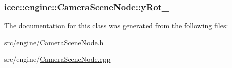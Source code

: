 \label{classicee_1_1engine_1_1CameraSceneNode_a88594483a4aa500a2ced3781a2179e78}
\hypertarget{classicee_1_1engine_1_1CameraSceneNode_a47c1195747ae82d087fb380fce092dbd}{
\subsubsection[{yRot\_\-}]{ {\bf icee::engine::CameraSceneNode::yRot\_\-}}}
\label{classicee_1_1engine_1_1CameraSceneNode_a47c1195747ae82d087fb380fce092dbd}


The documentation for this class was generated from the following files:\begin{DoxyCompactItemize}
\item 
src/engine/\hyperlink{CameraSceneNode_8h}{CameraSceneNode.h}\item 
src/engine/\hyperlink{CameraSceneNode_8cpp}{CameraSceneNode.cpp}\end{DoxyCompactItemize}
